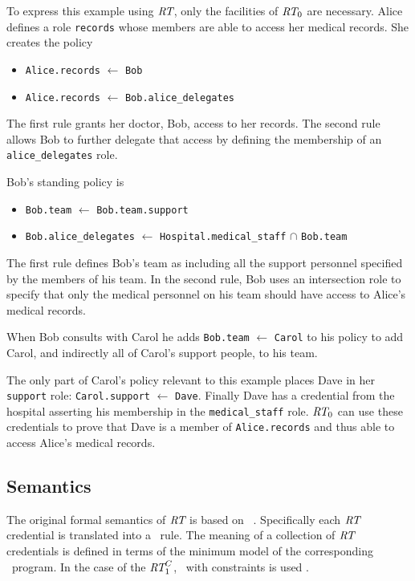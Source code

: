 To express this example using $\textit{RT}$, only the facilities of $\textit{RT}_0$ are necessary. Alice defines
a role \texttt{records} whose members are able to access her medical records. She creates the
policy
\begin{itemize}
\item \texttt{Alice.records} $\leftarrow$ \texttt{Bob}
\item \texttt{Alice.records} $\leftarrow$ \texttt{Bob.alice\_delegates}
\end{itemize}
The first rule grants her doctor, Bob, access to her records. The second rule allows Bob to
further delegate that access by defining the membership of an \texttt{alice\_delegates} role.

Bob's standing policy is
\begin{itemize}
\item \texttt{Bob.team} $\leftarrow$ \texttt{Bob.team.support}
\item \texttt{Bob.alice\_delegates} $\leftarrow$
  \texttt{Hospital.medical\_staff} $\cap$ \texttt{Bob.team}
\end{itemize}
The first rule defines Bob's team as including all the support personnel specified by the
members of his team. In the second rule, Bob uses an intersection role to specify that only the
medical personnel on his team should have access to Alice's medical records.

When Bob consults with Carol he adds \texttt{Bob.team} $\leftarrow$ \texttt{Carol} to his policy
to add Carol, and indirectly all of Carol's support people, to his team.

The only part of Carol's policy relevant to this example places Dave in her \texttt{support}
role: \texttt{Carol.support} $\leftarrow$ \texttt{Dave}. Finally Dave has a credential from the
hospital asserting his membership in the \texttt{medical\_staff} role. $\textit{RT}_0$ can use these
credentials to prove that Dave is a member of \texttt{Alice.records} and thus able to access
Alice's medical records.

\subsection{Semantics}

The original formal semantics of $\textit{RT}$ is based on \datalog\ \cite{Li:DRBTMF}. Specifically each
$\textit{RT}$ credential is translated into a \datalog\ rule. The meaning of a collection of $\textit{RT}$
credentials is defined in terms of the minimum model of the corresponding \datalog\ program. In
the case of the $\textit{RT}_1^C$, \datalog\ with constraints is used \cite{Li:DCFTML}.

